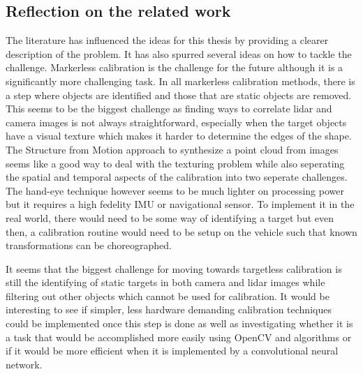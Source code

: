 \subsection{Reflection on the related work}
The literature has influenced the ideas for this thesis by providing a clearer description of the problem. It has also spurred several ideas on how to tackle the challenge. Markerless calibration is the challenge for the future although it is a significantly more challenging task. In all markerless calibration methods, there is a step where objects are identified and those that are static objects are removed. This seems to be the biggest challenge as finding ways to correlate lidar and camera images is not always straightforward, especially when the target objects have a visual texture which makes it harder to determine the edges of the shape. \\
The Structure from Motion approach to synthesize a point cloud from images seems like a good way to deal with the texturing problem while also seperating the spatial and temporal aspects of the calibration into two seperate challenges. The hand-eye technique however seems to be much lighter on processing power but it requires a high fedelity IMU or navigational sensor. To implement it in the real world, there would need to be some way of identifying a target but even then, a calibration routine would need to be setup on the vehicle such that known transformations can be choreographed. 

It seems that the biggest challenge for moving towards targetless calibration is still the identifying of static targets in both camera and lidar images while filtering out other objects which cannot be used for calibration. It would be interesting to see if simpler, less hardware demanding calibration techniques could be implemented once this step is done as well as investigating whether it is a task that would be accomplished more easily using OpenCV and algorithms or if it would be more efficient when it is implemented by a convolutional neural network.







